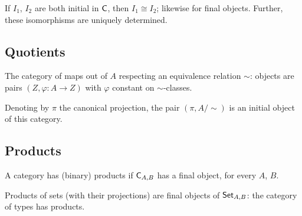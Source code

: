\begin{proposition}
  \label{prop:prelims:initial-final-unique}
  If $I_1$, $I_2$ are both initial in $\mathsf{C}$, then
  $I_1 \cong I_2$; likewise for final objects. Further, these
  isomorphisms are uniquely determined.
\end{proposition}

\subsection{Quotients}
\label{subsec:prelims:quotients}

\begin{definition}
  \label{def:prelims:quotient-map-category}
  \leanok
  The category of maps out of $A$ respecting an equivalence relation
  $\sim$: objects are pairs $(Z,\varphi : A \to Z)$ with $\varphi$
  constant on $\sim$-classes.
\end{definition}

\begin{proposition}
  \label{prop:prelims:quotient-universal}
  Denoting by $\pi$ the canonical projection, the pair
  $(\pi, A/{\sim})$ is an initial object of this category.
\end{proposition}

\subsection{Products}
\label{subsec:prelims:products}

\begin{definition}
  \label{def:prelims:has-products}
  \leanok
  A category has (binary) products if $\mathsf{C}_{A,B}$ has a final
  object, for every $A$, $B$.
\end{definition}

\begin{proposition}
  \label{prop:prelims:has-products-type-category}
  Products of sets (with their projections) are final objects of
  $\mathsf{Set}_{A,B}$: the category of types has products.
\end{proposition}

